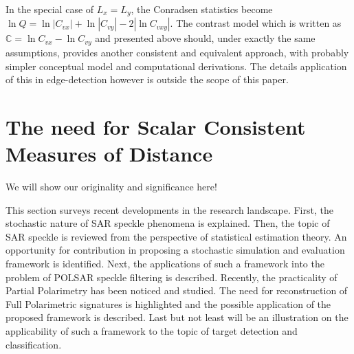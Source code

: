 In the special case of $L_x = L_y$, the Conradsen statistics become
$\ln Q = \ln |C_{vx}| + \ln |C_{vy}| - 2 |\ln C_{vxy}|$.
The contrast model which is written as $\mathbb{C} = \ln C_{vx} - \ln C_{vy}$ and presented above should, under exactly the same assumptions, provides another consistent and equivalent approach,
  with probably simpler conceptual model and computational derivations. 
The details application of this in edge-detection however is outside the scope of this paper.

\section{The need for Scalar Consistent Measures of Distance}
	We will show our originality and significance here!

This section surveys recent developments in the research landscape. 
First, the stochastic nature of SAR speckle phenomena is explained. 
Then, the topic of SAR speckle is reviewed from the perspective of statistical estimation theory. 
An opportunity for contribution in proposing a stochastic simulation and evaluation framework is identified. 
Next, the applications of such a framework into the problem of POLSAR speckle filtering is described. 
Recently, the practicality of Partial Polarimetry has been noticed and studied. 
The need for reconstruction of Full Polarimetric signatures is highlighted and the possible application of the proposed framework is described. 
Last but not least will be an illustration on the applicability of such a framework to the topic of target detection and classification.

        


